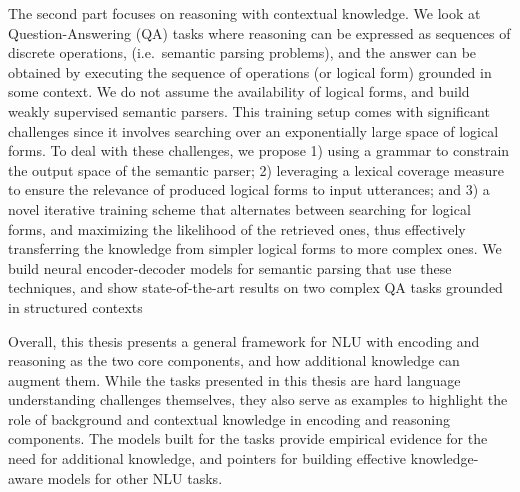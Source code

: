 The second part focuses on reasoning with contextual knowledge. We look at Question-Answering (QA) tasks where reasoning can be expressed as sequences of discrete operations, 
(i.e.\ semantic parsing problems), and the answer can be obtained by executing the sequence of operations (or logical form) grounded in some context.
We do not assume the availability of logical forms, and build weakly supervised semantic parsers. This training setup comes with significant challenges since it involves searching over an exponentially
large space of logical forms. To deal with these challenges, we propose 1) using a grammar to constrain the output space of the semantic parser; 2) leveraging a lexical coverage measure to ensure the
relevance of produced logical forms to input utterances; and 3) a novel iterative training scheme that alternates between searching for logical forms, and maximizing the likelihood of the retrieved ones, thus effectively transferring
the knowledge from simpler logical forms to more complex ones. We build neural encoder-decoder models for semantic parsing that use these techniques, and show state-of-the-art results on two complex QA tasks grounded in
structured contexts

Overall, this thesis presents a general framework for NLU with encoding and
reasoning as the two core components, and how additional knowledge can augment
them. While the tasks presented in this thesis are hard language understanding
challenges themselves, they also serve as examples to highlight the role of background
and contextual knowledge in encoding and reasoning components. The models built
for the tasks provide empirical evidence for the need for additional knowledge, and
pointers for building effective knowledge-aware models for other NLU tasks.
